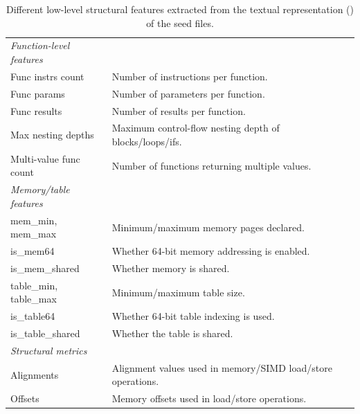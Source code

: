 \begin{table}[ht!]
\begin{tabular}{l|l}
\midrule
\textit{Function-level features} & \\
\hspace{0.5cm} Func instrs count & Number of instructions per function. \\
\hspace{0.5cm} Func params & Number of parameters per function. \\
\hspace{0.5cm} Func results & Number of results per function. \\
\hspace{0.5cm} Max nesting depths & Maximum control-flow nesting depth of blocks/loops/ifs. \\
\hspace{0.5cm} Multi-value func count & Number of functions returning multiple values. \\

\midrule
\textit{Memory/table features} & \\
\hspace{0.5cm} mem\_min, mem\_max & Minimum/maximum memory pages declared. \\
\hspace{0.5cm} is\_mem64 & Whether 64-bit memory addressing is enabled. \\
\hspace{0.5cm} is\_mem\_shared & Whether memory is shared. \\
\hspace{0.5cm} table\_min, table\_max & Minimum/maximum table size. \\
\hspace{0.5cm} is\_table64 & Whether 64-bit table indexing is used. \\
\hspace{0.5cm} is\_table\_shared & Whether the table is shared. \\

\midrule
\textit{Structural metrics} & \\
\hspace{0.5cm} Alignments & Alignment values used in memory/SIMD load/store operations. \\
\hspace{0.5cm} Offsets & Memory offsets used in load/store operations. \\
\bottomrule
\end{tabular}
\caption{ Different low-level structural features extracted from the textual representation () of the seed files.}
\label{tab:wat_features}
\end{table}
